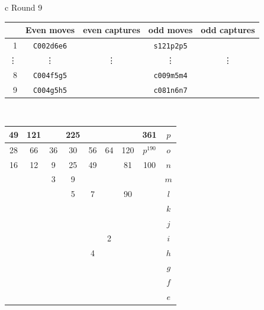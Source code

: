 \documentclass[12pt]{article}
\begin{document}
{\small{
\begin{tabular}{c}
Round 9 \\      
\begin{tabular}{r|cc|cc}
 & Even moves & even captures    & odd moves & odd captures \\    \hline 
1   &  {\tt C002d6e6} & \quad &  {\tt s121p2p5} & \quad \\
\vdots &  \vdots    & \vdots  & \vdots    & \vdots \\  
8   &  {\tt C004f5g5} & \quad &  {\tt c009m5m4} & \quad \\
9   &  {\tt C004g5h5} & \quad &  {\tt c081n6n7} & \quad \\
\end{tabular}
\\
\begin{tabular}{|c|c|c|c|c|c|c|c||c} \hline
\squadfill{\,}49 & \squadfill{\,}121 & \quad & \squadfill{\,}225 & \quad & \quad & \quad & \squadfill{\,}361 & $p$ \\ \hline
\squadfill{\,}28 & \squadfill{\,}66 & \trianglepafill{\,}36 & \trianglepafill{\,}30 & \trianglepafill{\,}56 & \trianglepafill{\,}64 & \squadfill{\,}120 & \rhombusfill{\,}$p^{190}$ & $o$ \\ \hline
\trianglepafill{\,}16 & \trianglepafill{\,}12 & \circletfill{\,}9 & \circletfill{\,}25 & \circletfill{\,}49 & \quad & \circletfill{\,}81 & \trianglepafill{\,}100 & $n$ \\ \hline
\quad & \quad & \circletfill{\,}3 & \circletfill{\,}9 & \quad & \quad & \quad & \quad & $m$ \\ \hline
\quad & \quad & \quad & \circletfill{\,}5 & \circletfill{\,}7 & \quad & \trianglepafill{\,}90 & \quad & $l$ \\ \hline
\quad & \quad & \quad & \quad & \quad & \quad & \quad & \quad & $k$ \\ \hline
\quad & \quad & \quad & \quad & \quad & \quad & \quad & \quad & $j$ \\ \hline
\quad & \quad & \quad & \quad & \quad & \circlet{\,}2 & \quad & \quad & $i$ \\ \hline
\quad & \quad & \quad & \quad & \circlet{\,}4 & \quad & \quad & \quad & $h$ \\ \hline
\quad & \quad & \quad & \quad & \quad & \quad & \quad & \quad & $g$ \\ \hline
\quad & \quad & \quad & \quad & \quad & \quad & \quad & \quad & $f$ \\ \hline
\quad & \quad & \quad & \quad & \quad & \quad & \quad & \quad & $e$ \\ \hline

\end{tabular}
\end{tabular}}}
\end{document}
